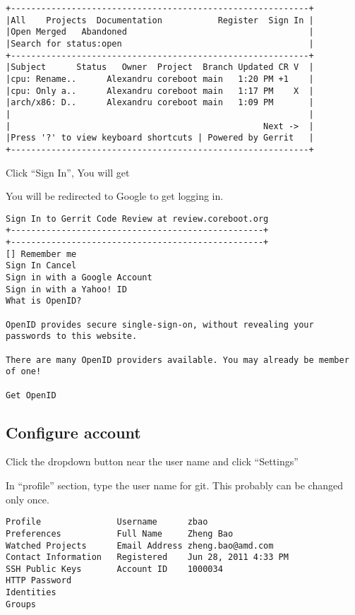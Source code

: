 \documentclass[titlepage,12pt]{article}
\begin{document}
{%
{ \small
\begin{verbatim}
+-----------------------------------------------------------+
|All    Projects  Documentation           Register  Sign In |
|Open Merged   Abandoned                                    |
|Search for status:open                                     |
+-----------------------------------------------------------+
|Subject      Status   Owner  Project  Branch Updated CR V  |
|cpu: Rename..      Alexandru coreboot main   1:20 PM +1    |
|cpu: Only a..      Alexandru coreboot main   1:17 PM    X  |
|arch/x86: D..      Alexandru coreboot main   1:09 PM       |
|                                                           |
|                                                  Next ->  |
|Press '?' to view keyboard shortcuts | Powered by Gerrit   |
+-----------------------------------------------------------+
\end{verbatim}
}
Click ``Sign In'', You will get


You will be redirected to Google to get logging in.

{ \small
\begin{verbatim}
Sign In to Gerrit Code Review at review.coreboot.org
+--------------------------------------------------+
+--------------------------------------------------+
[] Remember me
Sign In Cancel
Sign in with a Google Account
Sign in with a Yahoo! ID
What is OpenID?

OpenID provides secure single-sign-on, without revealing your passwords to this website.

There are many OpenID providers available. You may already be member of one!

Get OpenID
\end{verbatim}
}

\subsection{Configure account}
Click the dropdown button near the user name and click ``Settings''


\label{user name} In ``profile'' section, type the user name for git. This probably can be changed only once.
{ \small
\begin{verbatim}
Profile               Username      zbao
Preferences           Full Name     Zheng Bao
Watched Projects      Email Address zheng.bao@amd.com
Contact Information   Registered    Jun 28, 2011 4:33 PM
SSH Public Keys       Account ID    1000034
HTTP Password
Identities
Groups
\end{verbatim}
}

}
\end{document}
